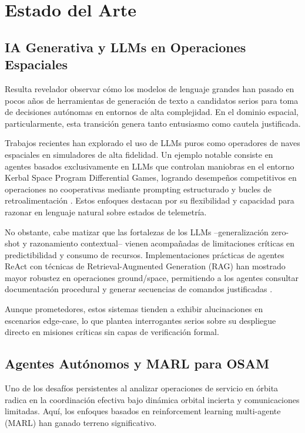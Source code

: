 \section{Estado del Arte}

\subsection{IA Generativa y LLMs en Operaciones Espaciales}

Resulta revelador observar cómo los modelos de lenguaje grandes han pasado en pocos años de herramientas de generación de texto a candidatos serios para toma de decisiones autónomas en entornos de alta complejidad. En el dominio espacial, particularmente, esta transición genera tanto entusiasmo como cautela justificada.

Trabajos recientes han explorado el uso de LLMs puros como operadores de naves espaciales en simuladores de alta fidelidad. Un ejemplo notable consiste en agentes basados exclusivamente en LLMs que controlan maniobras en el entorno Kerbal Space Program Differential Games, logrando desempeños competitivos en operaciones no cooperativas mediante prompting estructurado y bucles de retroalimentación \cite{Carrasco2025_LLMSpace}. Estos enfoques destacan por su flexibilidad y capacidad para razonar en lenguaje natural sobre estados de telemetría.

No obstante, cabe matizar que las fortalezas de los LLMs --generalización zero-shot y razonamiento contextual-- vienen acompañadas de limitaciones críticas en predictibilidad y consumo de recursos. Implementaciones prácticas de agentes ReAct con técnicas de Retrieval-Augmented Generation (RAG) han mostrado mayor robustez en operaciones ground/space, permitiendo a los agentes consultar documentación procedural y generar secuencias de comandos justificadas \cite{Li2025_AIAgents}. 

Aunque prometedores, estos sistemas tienden a exhibir alucinaciones en escenarios edge-case, lo que plantea interrogantes serios sobre su despliegue directo en misiones críticas sin capas de verificación formal.

\subsection{Agentes Autónomos y MARL para OSAM}

Uno de los desafíos persistentes al analizar operaciones de servicio en órbita radica en la coordinación efectiva bajo dinámica orbital incierta y comunicaciones limitadas. Aquí, los enfoques basados en reinforcement learning multi-agente (MARL) han ganado terreno significativo.

